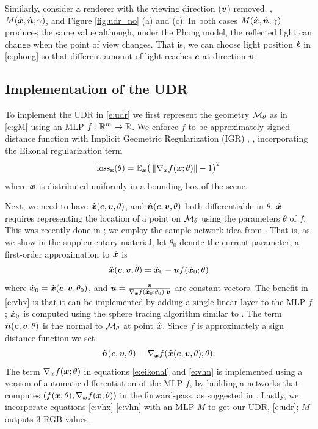 \documentclass[runningheads]{llncs}
\begin{document}
Similarly, consider a renderer with the viewing direction (${\bm{v}}$) removed, \ie, $M({\hat{\bm{x}}},{\hat{\bm{n}}};\gamma)$, and Figure \ref{fig:udr_no} (a) and (c): In both cases $M({\hat{\bm{x}}},{\hat{\bm{n}}};\gamma)$ produces the same value although, under the Phong model, the reflected light can change when the point of view changes. That is, we can choose light position ${\bm{\ell}}$ in \eqref{e:phong} so that different amount of light reaches ${\bm{c}}$ at direction ${\bm{v}}$. 



\subsection{Implementation of the UDR}
To implement the UDR in \eqref{e:udr} we first represent the geometry ${\mathcal{M}}_\theta$ as in \eqref{e:gM} using an MLP $f:\mathbb R^m\rightarrow\mathbb R$. We enforce $f$ to be approximately signed distance function with Implicit Geometric Regularization (IGR) \cite{gropp2020implicit}, \ie, incorporating the Eikonal regularization term 
\begin{equation}\label{e:eikonal}
\mathrm{loss}_{\scriptscriptstyle\mathrm{E}}(\theta) = \mathbb{E}_{{\bm{x}}} \big(\left\Vert\nabla_{\bm{x}} f({\bm{x}};\theta)\right\Vert-1\big)^2
\end{equation}
where ${\bm{x}}$ is distributed uniformly in a bounding box of the scene. 

Next, we need to have ${\hat{\bm{x}}}({\bm{c}},{\bm{v}},\theta)$, and ${\hat{\bm{n}}}({\bm{c}},{\bm{v}},\theta)$ both differentiable in $\theta$. ${\hat{\bm{x}}}$ requires representing the location of a point on ${\mathcal{M}}_\theta$ using the parameters $\theta$ of $f$. This was recently done in \cite{atzmon2019controlling,niemeyer2019differentiable}; we employ the sample network idea from \cite{atzmon2019controlling}. That is, as we show in the supplementary material, let $\theta_0$ denote the current parameter, a first-order approximation to ${\hat{\bm{x}}}$ is
\begin{equation}\label{e:vhx}
    {\hat{\bm{x}}}({\bm{c}},{\bm{v}},\theta) = {\hat{\bm{x}}}_0 - {\bm{u}} f({\hat{\bm{x}}}_0;\theta)
\end{equation}
where ${\hat{\bm{x}}}_0={\hat{\bm{x}}}({\bm{c}},{\bm{v}},\theta_0)$, and ${\bm{u}}=\frac{{\bm{v}}}{\nabla_{\bm{x}} f({\hat{\bm{x}}}_0;\theta_0) \cdot {\bm{v}}}$ are constant vectors. The benefit in \eqref{e:vhx} is that it can be implemented by adding a single linear layer to the MLP $f$; 
%
${\hat{\bm{x}}}_0$ is computed using the sphere tracing algorithm similar to  \cite{liu2019dist}.
%
The term ${\hat{\bm{n}}}({\bm{c}},{\bm{v}},\theta)$ is the normal to ${\mathcal{M}}_\theta$ at point ${\hat{\bm{x}}}$. Since $f$ is approximately a sign distance function we set 
\begin{equation}\label{e:vhn}
{\hat{\bm{n}}}({\bm{c}},{\bm{v}},\theta)=\nabla_{\bm{x}} f( {\hat{\bm{x}}}({\bm{c}},{\bm{v}},\theta) ; \theta ).
\end{equation}
The term $\nabla_{\bm{x}} f({\bm{x}} ; \theta)$ in equations \ref{e:eikonal} and \ref{e:vhn} is implemented using a version of automatic differentiation of the MLP $f$, by building a networks that computes $(f({\bm{x}};\theta),\nabla_{\bm{x}} f({\bm{x}};\theta))$ in the forward-pass, as suggested in \cite{gropp2020implicit}. Lastly, we incorporate equations \ref{e:vhx}-\ref{e:vhn} with an MLP $M$ to get our UDR, \eqref{e:udr}; $M$ outputs 3 RGB values. 
\end{document}
